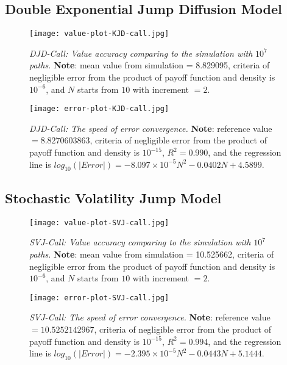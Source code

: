 \subsection{Double Exponential Jump Diffusion Model}
\begin{figure}[H]
    \centering
    \texttt{[image: value-plot-KJD-call.jpg]}
    \caption[\emph{DJD-Call: Value accuracy comparing to the simulation with} $10^7$ \emph{paths.}]{\emph{DJD-Call: Value accuracy comparing to the simulation with} $10^7$ \emph{paths.} \textbf{Note}: mean value from simulation = 8.829095, criteria of negligible error from the product of payoff function and density is $10^{-6}$, and $N$ starts from $10$  with increment $=2$.}

    \label{fig:label}
\end{figure}

\begin{figure}[H]
    \centering
    \texttt{[image: error-plot-KJD-call.jpg]}
    \caption[\emph{DJD-Call: The speed of error convergence.}]{\emph{DJD-Call: The speed of error convergence.} \textbf{Note}: reference value $=8.8270603863$, criteria of negligible error from the product of payoff function and density is $10^{-15}$, $R^2=0.990$, and the regression line is $log_{10}\left(|Error|\right) = -8.097\times 10^{-5}N^2-0.0402N+4.5899$.}
    
    \label{fig:label}
\end{figure}



\subsection{Stochastic Volatility Jump Model}
\begin{figure}[H]
    \centering
    \texttt{[image: value-plot-SVJ-call.jpg]}
    \caption[\emph{SVJ-Call: Value accuracy comparing to the simulation with} $10^7$ \emph{paths.}]{\emph{SVJ-Call: Value accuracy comparing to the simulation with} $10^7$ \emph{paths.} \textbf{Note}: mean value from simulation = 10.525662, criteria of negligible error from the product of payoff function and density is $10^{-6}$, and $N$ starts from $10$  with increment $=2$.}
    
    \label{fig:label}
\end{figure}

\begin{figure}[H]
    \centering
    \texttt{[image: error-plot-SVJ-call.jpg]}
    \caption[\emph{SVJ-Call: The speed of error convergence.}]{\emph{SVJ-Call: The speed of error convergence.} \textbf{Note}: reference value $=10.5252142967$, criteria of negligible error from the product of payoff function and density is $10^{-15}$, $R^2=0.994$, and the regression line is $log_{10}\left(|Error|\right) = -2.395\times 10^{-5}N^2-0.0443N+5.1444$.}

    \label{fig:label}
\end{figure}



